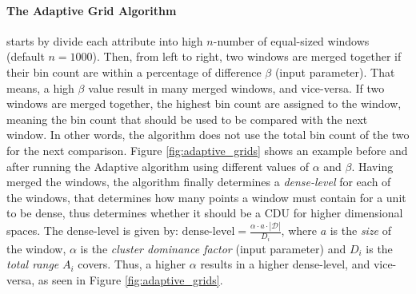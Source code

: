 \paragraph{The Adaptive Grid Algorithm}
starts by divide each attribute into high $n$-number of equal-sized windows (default $n = 1000$). Then, from left to right, two windows are merged together if their bin count are within a percentage of difference $\beta$ (input parameter). That means, a high $\beta$ value result in many merged windows, and vice-versa. If two windows are merged together, the highest bin count are assigned to the window, meaning the bin count that should be used to be compared with the next window. In other words, the algorithm does not use the total bin count of the two for the next comparison. Figure \ref{fig:adaptive_grids} shows an example before and after running the Adaptive algorithm using different values of $\alpha$ and $\beta$. Having merged the windows, the algorithm finally determines a \textit{dense-level} for each of the windows, that determines how many points a window must contain for a unit to be dense, thus determines whether it should be a CDU for higher dimensional spaces. The dense-level is given by: $\text{dense-level} = \frac{\alpha \cdot a\cdot |\mathcal{D}|}{D_i}$, where $a$ is the \textit{size} of the window, $\alpha$ is the \textit{cluster dominance factor} (input parameter) and $D_i$ is the \textit{total range} $A_i$ covers. Thus, a higher $\alpha$ results in a higher dense-level, and vice-versa, as seen in Figure \ref{fig:adaptive_grids}.

